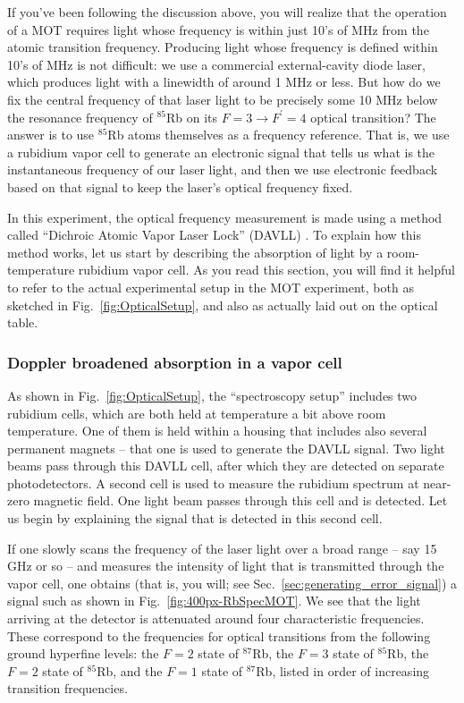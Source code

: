 \documentclass{../lab}
\begin{document}
If you've been following the discussion above, you will realize that the operation of a MOT requires light whose frequency is within just 10's of MHz from the atomic transition frequency.  Producing light whose frequency is defined within 10's of MHz is not difficult: we use a commercial external-cavity diode laser, which produces light with a linewidth of around 1 MHz or less.  But how do we fix the central frequency of that laser light to be precisely some 10 MHz below the resonance frequency of $^{85}$Rb on its $F=3 \rightarrow F^\prime = 4$ optical transition?  The answer is to use $^{85}$Rb atoms themselves as a frequency reference.  That is, we use a rubidium vapor cell to generate an electronic signal that tells us what is the instantaneous frequency of our laser light, and then we use electronic feedback based on that signal to keep the laser's optical frequency fixed.

In this experiment, the optical frequency measurement is made using a method called ``Dichroic Atomic Vapor Laser Lock'' (DAVLL) \cite{Corwin}.  To explain how this method works, let us start by describing the absorption of light by a room-temperature rubidium vapor cell.  As you read this section, you will find it helpful to refer to the actual experimental setup in the MOT experiment, both as sketched in Fig.\ \ref{fig:OpticalSetup}, and also as actually laid out on the optical table.

\subsubsection{Doppler broadened absorption in a vapor cell}

As shown in Fig.\ \ref{fig:OpticalSetup}, the ``spectroscopy setup'' includes two rubidium cells, which are both held at temperature a bit above room temperature.  One of them is held within a housing that includes also several permanent magnets -- that one is used to generate the DAVLL signal.  Two light beams pass through this DAVLL cell, after which they are detected on separate photodetectors.  A second cell is used to measure the rubidium spectrum at near-zero magnetic field.   One light beam passes through this cell and is detected.  Let us begin by explaining the signal that is detected in this second cell.

If one slowly scans the frequency of the laser light over a broad range -- say 15 GHz or so -- and measures the intensity of light that is transmitted through the vapor cell, one obtains (that is, you will; see Sec.\ \ref{sec:generating_error_signal}) a signal such as shown in Fig.\ \ref{fig:400px-RbSpecMOT}.  We see that the light arriving at the detector is attenuated around four characteristic frequencies.  These correspond to the frequencies for optical transitions from the following ground hyperfine levels: the $F=2$ state of $^{87}$Rb, the $F=3$ state of  $^{85}$Rb, the $F=2$ state of  $^{85}$Rb, and the  $F=1$ state of  $^{87}$Rb, listed in order of increasing transition frequencies.
\end{document}
